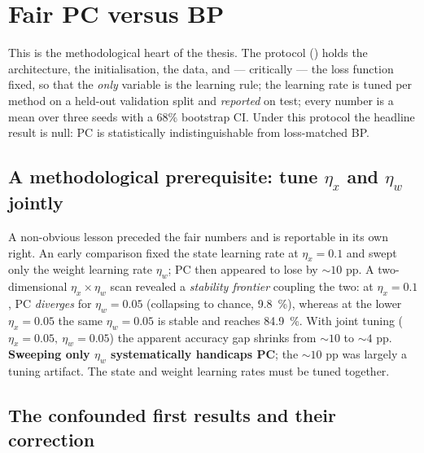 \section{Fair PC versus BP}\label{sec:exp-pcbp}

This is the methodological heart of the thesis. The protocol () holds the
architecture, the initialisation, the data, and --- critically --- the loss function fixed, so
that the \emph{only} variable is the learning rule; the learning rate is tuned per method on a
held-out validation split and \emph{reported} on test; every number is a mean over three seeds with
a \(68\%\) bootstrap CI. Under this protocol the headline result is null: PC is statistically
indistinguishable from loss-matched BP.

\subsection{A methodological prerequisite: tune \texorpdfstring{\(\eta_x\)}{eta\_x} and
\texorpdfstring{\(\eta_w\)}{eta\_w} jointly}

A non-obvious lesson preceded the fair numbers and is reportable in its own right. An early
comparison fixed the state learning rate at \(\eta_x=0.1\) and swept only the weight learning rate
\(\eta_w\); PC then appeared to lose by \(\sim\!10\) pp. A two-dimensional \(\eta_x\times\eta_w\)
scan revealed a \emph{stability frontier} coupling the two: at \(\eta_x=0.1\), PC \emph{diverges}
for \(\eta_w=0.05\) (collapsing to chance, \SI{9.8}{\percent}), whereas at the lower
\(\eta_x=0.05\) the same \(\eta_w=0.05\) is stable and reaches \SI{84.9}{\percent}. With joint
tuning (\(\eta_x=0.05,\ \eta_w=0.05\)) the apparent accuracy gap shrinks from \(\sim\!10\) to
\(\sim\!4\) pp. \textbf{Sweeping only \(\eta_w\) systematically handicaps PC}; the \(\sim\!10\) pp
was largely a tuning artifact. The state and weight learning rates must be tuned together.

\subsection{The confounded first results and their correction}

